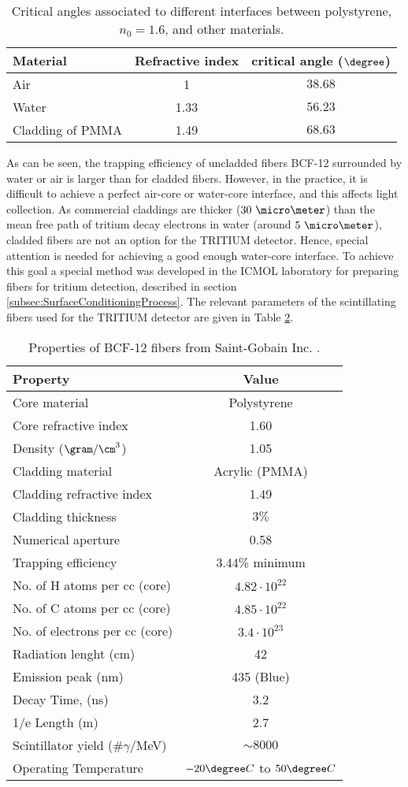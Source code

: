 \begin{table}[htbp]
\centering{}%
\begin{tabular}{lcc}
\toprule 
Material & Refractive index & critical angle ($\degree$) \tabularnewline
\midrule
\midrule 
Air & 1 & $38.68$ \tabularnewline
Water & 1.33 & $56.23$ \tabularnewline
Cladding of PMMA & 1.49 & $68.63$ \tabularnewline
\bottomrule
\end{tabular}
\caption{Critical angles associated to different interfaces between polystyrene, $n_0=1.6$, and other materials.}
\label{tab:CriticalAngles}
\end{table}
As can be seen, the trapping efficiency of uncladded fibers BCF-12 surrounded by water or air is larger than for cladded fibers. However, in the practice, it is difficult to achieve a perfect air-core or water-core interface, and this affects light collection. As commercial claddings are thicker ($30~\micro \meter$) than the mean free path of tritium decay electrons in water (around $5~\micro\meter$), cladded fibers are not an option for the TRITIUM detector. Hence, special attention is needed for achieving a good enough water-core interface. To achieve this goal a special method was developed in the ICMOL laboratory for preparing fibers for tritium detection, described in section \ref{subsec:SurfaceConditioningProcess}. The relevant parameters of the scintillating fibers used for the TRITIUM detector are given in Table \ref{tab:ParametersFibersBCF12}.

\begin{table}[htbp]
\centering{}%
\begin{tabular}{lc}
\toprule 
Property & Value \tabularnewline
\midrule
\midrule 
Core material & Polystyrene \tabularnewline
Core refractive index & 1.60 \tabularnewline
Density ($\gram/\cm^3$) & 1.05 \tabularnewline
Cladding material & Acrylic (PMMA) \tabularnewline
Cladding refractive index & 1.49 \tabularnewline
Cladding thickness & $3\%$ \tabularnewline
Numerical aperture & 0.58 \tabularnewline
Trapping efficiency & 3.44\% minimum \tabularnewline
No. of H atoms per cc (core) & $4.82 \cdot{} 10^{22}$ \tabularnewline
No. of C atoms per cc (core) & $4.85 \cdot{} 10^{22}$ \tabularnewline
No. of electrons per cc (core) & $3.4 \cdot{} 10^{23}$ \tabularnewline
Radiation lenght (cm) & 42 \tabularnewline
Emission peak (nm) & 435 (Blue) \tabularnewline
Decay Time, (ns) & 3.2 \tabularnewline
1/e Length (m) & 2.7 \tabularnewline
Scintillator yield (\#$\gamma$/MeV) & $\sim 8000$ \tabularnewline
Operating Temperature & $-20\degree C$ to $50\degree C$ \tabularnewline
\bottomrule
\end{tabular}
\caption{Properties of BCF-12 fibers from Saint-Gobain Inc. \cite{DataSheetBCF12Fiber}.}
\label{tab:ParametersFibersBCF12}
\end{table}